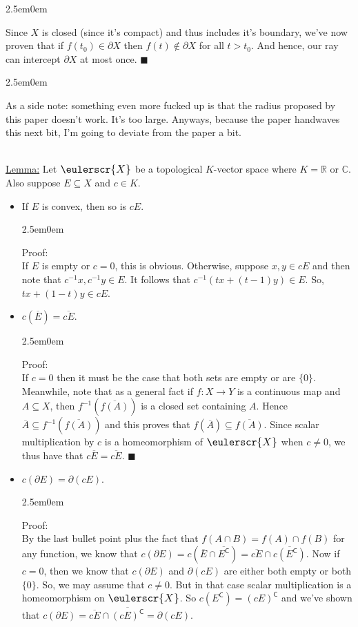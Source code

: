 \documentclass{book}
\newcommand{\mathcalli}[1]{\text{\scalebox{1.11}{$\eulerscr{#1}$}}}
\newcommand{\myComment}{%
   \color{RawerSienna}%
   \fontsize{12}{14}\selectfont%
}
\newcommand{\pracOne}{
   \color{BrickRed}%
   \fontsize{13}{15}\selectfont%
}
\newcommand{\pracTwo}{
   \color{Orange}%
   \fontsize{12}{14}\selectfont%
}
\newenvironment{myIndent}{%
   \begin{adjustwidth}{2.5em}{0em}%
}{%
   \end{adjustwidth}%
}
\newcommand{\comp}{\mathsf{C}}
\newcommand{\mySepTwo}[1][.]{%
   {\noindent\color{#1}{\rule{6.5in}{0.5mm}}}\\%
}
\newcommand{\retTwo}{\hfill\bigbreak}
\begin{document}
\begin{myIndent}
	\newpage

	Since $X$ is closed (since it's compact) and thus includes it's boundary, we've now proven that if $f(t_0) \in \partial X$ then $f(t) \notin \partial X$ for all $t > t_0$. And hence, our ray can intercept $\partial X$ at most once. $\blacksquare$
	\begin{myIndent}\myComment
		As a side note: something even more fucked up is that the radius proposed by this paper doesn't work. It's too large. Anyways, because the paper handwaves this next bit, I'm going to deviate from the paper a bit.\retTwo
	\end{myIndent}
\end{myIndent}

\pracOne\mySepTwo
\ul{Lemma:} Let $\mathcalli{X}$ be a topological $K$-vector space where $K = \mathbb{R}$ or $\mathbb{C}$. Also suppose $E \subseteq X$ and $c \in K$. 
\begin{itemize}
	\item If $E$ is convex, then so is $cE$.
	\begin{myIndent}\pracTwo
		Proof:\\
		If $E$ is empty or $c = 0$, this is obvious. Otherwise, suppose $x, y \in cE$ and then note that $c^{-1}x, c^{-1}y \in E$. It follows that $c^{-1}(tx + (t-1)y) \in E$. So, $tx + (1-t)y \in cE$.\retTwo
	\end{myIndent}

	\item $c(\overline{E}) = \overline{cE}$.
	\begin{myIndent}\pracTwo
		Proof:\\
		If $c = 0$ then it must be the case that both sets are empty or are $\{0\}$. Meanwhile, note that as a general fact if $f : X \to Y$ is a continuous map and $A \subseteq X$, then $f^{-1}(\overline{f(A)})$ is a closed set containing $A$. Hence $\overline{A} \subseteq f^{-1}(\overline{f(A)})$ and this proves that $f(\overline{A}) \subseteq \overline{f(A)}$. Since scalar multiplication by $c$ is a homeomorphism of $\mathcalli{X}$ when $c \neq 0$, we thus have that $c\overline{E} = \overline{cE}$. $\blacksquare$\retTwo
	\end{myIndent}

	\item $c(\partial E) = \partial (cE)$.
	\begin{myIndent}\pracTwo
		Proof:\\
		By the last bullet point plus the fact that $f(A \cap B) = f(A) \cap f(B)$ for any function, we know that $c(\partial E) = c(\overline{E} \cap \overline{E^\comp}) = \overline{cE} \cap \overline{c(E^\comp)}$. Now if $c = 0$, then we know that $c(\partial E)$ and $\partial (cE)$ are either both empty or both $\{0\}$. So, we may assume that $c \neq 0$. But in that case scalar multiplication is a homeomorphism on $\mathcalli{X}$. So $c(E^\comp) = (cE)^\comp$ and we've shown that $c(\partial E) = \overline{cE} \cap \overline{(cE)^\comp} = \partial (cE)$.\retTwo
	\end{myIndent}
\end{itemize}
\end{document}
